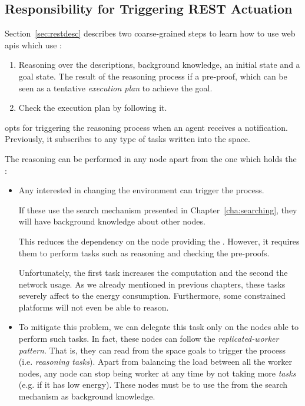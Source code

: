 \subsection{Responsibility for Triggering REST Actuation}
\label{sec:responsible_proof}

Section~\ref{sec:restdesc} describes two coarse-grained steps to learn how to use web \acsp{api} which use \restdesc{}:
\begin{enumerate}
  \item Reasoning over the descriptions, background knowledge, an initial state and a goal state.
        The result of the reasoning process if a pre-proof, which can be seen as a tentative \emph{execution plan} to achieve the goal.
  \item Check the execution plan by following it.
\end{enumerate}


\implMix{} opts for triggering the reasoning process when an agent receives a notification.
Previously, it subscribes to any type of tasks written into the space.


The reasoning can be performed in any node apart from the one which holds the \Space{}:

\begin{itemize}
  \item Any \consumer{} interested in changing the environment can trigger the process.
	\begin{sloppypar}If these \consumers{} use the search mechanism presented in Chapter~\ref{cha:searching}, they will have background knowledge about other nodes.\end{sloppypar}
	This reduces the dependency on the node providing the \coordspace{}.
	However, it requires them to perform tasks such as reasoning and checking the pre-proofs.
	
	Unfortunately, the first task increases the computation and the second the network usage.
	As we already mentioned in previous chapters, these tasks severely affect to the energy consumption.
	Furthermore, some constrained platforms will not even be able to reason.
	
  \item To mitigate this problem, we can delegate this task only on the nodes able to perform such tasks.
	In fact, these nodes can follow the \emph{replicated-worker pattern}.
	That is, they can read from the space goals to trigger the process (i.e. \emph{reasoning tasks}).
	Apart from balancing the load between all the worker nodes, any node can stop being worker at any time by not taking more \emph{tasks} (e.g. if it has low energy).
	These nodes must be \consumers{} to use the \clues{} from the search mechanism as background knowledge.
\end{itemize}


